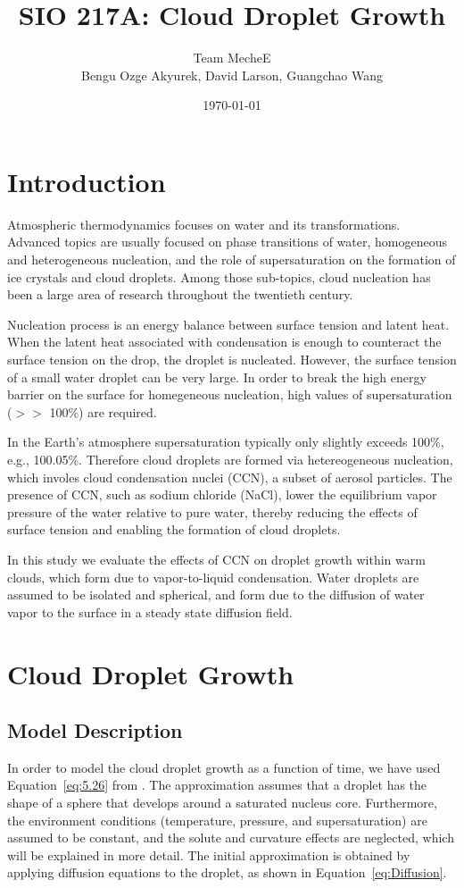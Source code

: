\documentclass[titlepage]{article}
\title{SIO 217A: Cloud Droplet Growth}
\author{Team MecheE \\ Bengu Ozge Akyurek, David Larson, Guangchao Wang}
\date{\today}
\begin{document}
\maketitle


\section{Introduction}
Atmospheric thermodynamics focuses on water and its transformations. Advanced
topics are usually focused on phase transitions of water, homogeneous and
heterogeneous nucleation, and the role of supersaturation on the formation of ice
crystals and cloud droplets. Among those sub-topics, cloud nucleation has been
a large area of research throughout the twentieth century.

Nucleation process is an energy balance between surface tension and
latent heat. When the latent heat associated with condensation is enough to
counteract the surface tension on the drop, the droplet is nucleated. However, the
surface tension of a small water droplet can be very large. In order to break
the high energy barrier on the surface for homegeneous nucleation, high values
of supersaturation ($>>$ 100\%) are required.

In the Earth's atmosphere supersaturation typically only slightly exceeds
100\%, e.g., 100.05\%.  Therefore cloud droplets are formed via hetereogeneous
nucleation, which involes cloud condensation nuclei (CCN), a subset of aerosol
particles. The presence of CCN, such as sodium chloride (NaCl), lower the
equilibrium vapor pressure of the water relative to pure water, thereby
reducing the effects of surface tension and enabling the formation of cloud
droplets.

In this study we evaluate the effects of CCN on droplet growth within warm
clouds, which form due to vapor-to-liquid condensation. Water droplets are
assumed to be isolated and spherical, and form due to the diffusion of
water vapor to the surface in a steady state diffusion field.


\section{Cloud Droplet Growth}

\subsection{Model Description}
In order to model the cloud droplet growth as a function of time, we have used
Equation~\eqref{eq:5.26} from \cite{Curry}.  The approximation assumes that a
droplet has the shape of a sphere that develops around a saturated nucleus
core. Furthermore, the environment conditions (temperature, pressure, and
supersaturation) are assumed to be constant, and the solute and curvature
effects are neglected, which will be explained in more detail. The initial
approximation is obtained by applying diffusion equations to the droplet, as
shown in Equation~\eqref{eq:Diffusion}.
\end{document}
